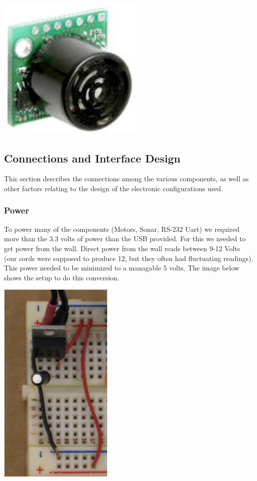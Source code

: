   \begin{center}
    \includegraphics[width=70mm, height= 70mm]{imageSources/sonar.png}
  \end{center}
  \label{sonar}


\subsection{Connections and Interface Design}
This section describes the connections among the various components, as well as other factors relating to the design of the electronic configurations used.  

\subsubsection{Power}
To power many of the components (Motors, Sonar, RS-232 Uart) we required more than the 3.3 volts of power than the USB provided. For this we needed to get power from the wall. Direct power from the wall reads between 9-12 Volts (our cords were supposed to produce 12, but they often had fluctuating readings).  This power needed to be minimized to a managable 5 volts.  The image below shows the setup to do this conversion.

  \begin{center}
    \includegraphics[scale=0.5]{imageSources/power12to5.png}
  \end{center}
  \label{power12to5}


